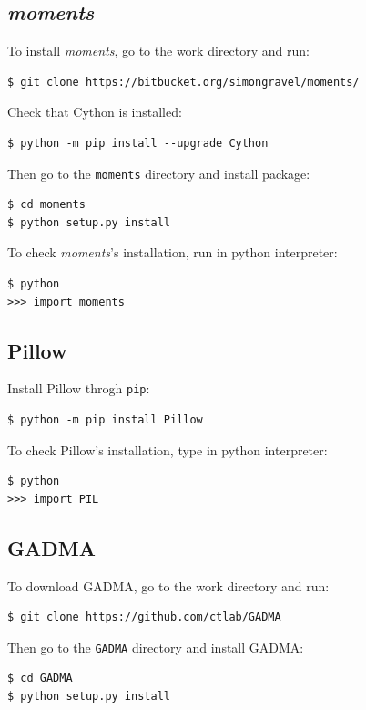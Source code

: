 \documentclass[12pt]{article}
\makeatletter
\newcommand{\moments}{\textit{moments}\xspace}
\newcommand{\py}[1]{\lstinline[language=Python, showstringspaces=False]@#1@}
\makeatother
\begin{document}
\subsection{\moments}

To install \moments, go to the work directory and run:

\begin{lstlisting}
$ git clone https://bitbucket.org/simongravel/moments/
\end{lstlisting}

Check that Cython is installed:
\begin{lstlisting}
$ python -m pip install --upgrade Cython
\end{lstlisting}

Then go to the \py{moments} directory and install package:

\begin{lstlisting}
$ cd moments
$ python setup.py install
\end{lstlisting}

To check \moments's installation, run in python interpreter:

\begin{lstlisting}
$ python
>>> import moments
\end{lstlisting}

\subsection{Pillow}

Install Pillow throgh \py{pip}:

\begin{lstlisting}
$ python -m pip install Pillow
\end{lstlisting}

To check Pillow's installation, type in python interpreter:

\begin{lstlisting}
$ python
>>> import PIL
\end{lstlisting}

\subsection{GADMA}
To download GADMA, go to the work directory and run:

\begin{lstlisting}
$ git clone https://github.com/ctlab/GADMA
\end{lstlisting}

Then go to the \py{GADMA} directory and install GADMA:
\begin{lstlisting}
$ cd GADMA
$ python setup.py install
\end{lstlisting}
\end{document}
